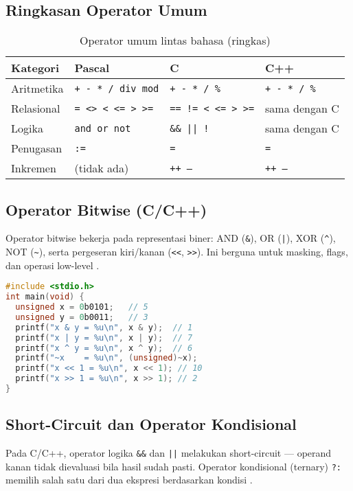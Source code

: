 \documentclass[../main.tex]{subfiles}
\begin{document}
\subsection{Ringkasan Operator Umum}
\begin{table}[H]
  \centering
  \caption{Operator umum lintas bahasa (ringkas)}
  \begin{tabular}{@{}llll@{}}
    \toprule
    Kategori & Pascal & C & C++ \\
    \midrule
    Aritmetika & \texttt{+ - * / div mod} & \texttt{+ - * / \%} & \texttt{+ - * / \%} \\
    Relasional & \texttt{= {\textless}{\textgreater} {\textless} {\textless}= {\textgreater} {\textgreater}=} & \texttt{== != {\textless} {\textless}= {\textgreater} {\textgreater}=} & sama dengan C \\
    Logika & \texttt{and or not} & \texttt{\&\& || !} & sama dengan C \\
    Penugasan & \texttt{:=} & \texttt{=} & \texttt{=} \\
    Inkremen & (tidak ada) & \texttt{++ --} & \texttt{++ --} \\
    \bottomrule
  \end{tabular}
\end{table}

\subsection{Operator Bitwise (C/C++)}
Operator bitwise bekerja pada representasi biner: AND (\texttt{\&}), OR (\texttt{|}), XOR (\texttt{\^{}}), NOT (\texttt{\textasciitilde}), serta pergeseran kiri/kanan (\texttt{<<}, \texttt{>>}). Ini berguna untuk masking, flags, dan operasi low-level \parencite{c-bitwise-ops,cpp-bitwise-ops}.

\begin{lstlisting}[language=C, caption={Contoh operator bitwise di C}]
#include <stdio.h>
int main(void) {
  unsigned x = 0b0101;   // 5
  unsigned y = 0b0011;   // 3
  printf("x & y = %u\n", x & y);  // 1
  printf("x | y = %u\n", x | y);  // 7
  printf("x ^ y = %u\n", x ^ y);  // 6
  printf("~x    = %u\n", (unsigned)~x);
  printf("x << 1 = %u\n", x << 1); // 10
  printf("x >> 1 = %u\n", x >> 1); // 2
}
\end{lstlisting}

\subsection{Short-Circuit dan Operator Kondisional}
Pada C/C++, operator logika \texttt{\&\&} dan \texttt{||} melakukan short-circuit — operand kanan tidak dievaluasi bila hasil sudah pasti. Operator kondisional (ternary) \texttt{?:} memilih salah satu dari dua ekspresi berdasarkan kondisi \parencite{c-conditional-operator,cpp-conditional-operator}.
\end{document}
